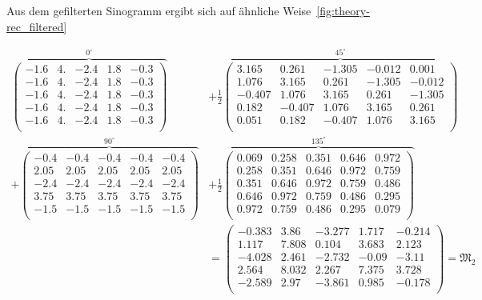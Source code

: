 \documentclass[slug=PET, room=Andreas-Schubert-Bau\,\ 424A, supervisor=Carsten\ Bittrich, coursedate=10.\ 01.\ 2020]{../../Lab_Report_LaTeX/lab_report}
\begin{document}
Aus dem gefilterten Sinogramm ergibt sich auf \"ahnliche
Weise~\ref{fig:theory-rec_filtered}
{\footnotesize
\setlength{\arraycolsep}{2.5pt}

\begin{align}
  \label{eq:simplerepr}
  \overbrace{\begin{pmatrix}
      -1.6 & 4. & -2.4 & 1.8 & -0.3\\
      -1.6 & 4. & -2.4 & 1.8 & -0.3\\
      -1.6 & 4. & -2.4 & 1.8 & -0.3\\
      -1.6 & 4. & -2.4 & 1.8 & -0.3\\
      -1.6 & 4. & -2.4 & 1.8 & -0.3\\
    \end{pmatrix}}^{0^\circ} & + \frac{1}{2}\overbrace{\begin{pmatrix}
      3.165 & 0.261 & -1.305 & -0.012 & 0.001\\
      1.076 & 3.165 & 0.261 & -1.305 & -0.012\\
      -0.407 & 1.076 & 3.165 & 0.261 & -1.305\\
      0.182 & -0.407 & 1.076 & 3.165 & 0.261\\
      0.051 & 0.182 & -0.407 & 1.076 & 3.165\\
    \end{pmatrix}}^{45^\circ} \nonumber \\ +
  \overbrace{\begin{pmatrix}
      -0.4 & -0.4 & -0.4 & -0.4 & -0.4\\
      2.05 & 2.05 & 2.05 & 2.05 & 2.05\\
      -2.4 & -2.4 & -2.4 & -2.4 & -2.4\\
      3.75 & 3.75 & 3.75 & 3.75 & 3.75\\
      -1.5 & -1.5 & -1.5 & -1.5 & -1.5\\
    \end{pmatrix}}^{90^\circ} &+ \frac{1}{2}\overbrace{\begin{pmatrix}
      0.069 & 0.258 & 0.351 & 0.646 & 0.972\\
      0.258 & 0.351 & 0.646 & 0.972 & 0.759\\
      0.351 & 0.646 & 0.972 & 0.759 & 0.486\\
      0.646 & 0.972 & 0.759 & 0.486 & 0.295\\
      0.972 & 0.759 & 0.486 & 0.295 & 0.079\\
    \end{pmatrix}}^{135^\circ}\nonumber \\
           &= \begin{pmatrix}
             -0.383 & 3.86 & -3.277 & 1.717 & -0.214\\
             1.117 & 7.808 & 0.104 & 3.683 & 2.123\\
             -4.028 & 2.461 & -2.732 & -0.09 & -3.11\\
             2.564 & 8.032 & 2.267 & 7.375 & 3.728\\
             -2.589 & 2.97 & -3.861 & 0.985 & -0.178\\
           \end{pmatrix} = \mathfrak{M}_2
\end{align}
}
\end{document}
